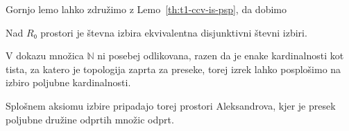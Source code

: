 Gornjo lemo lahko združimo z Lemo~\ref{th:t1-ccv-is-psp}, da dobimo
\begin{trditev}
  Nad \(R₀\) prostori je števna izbira ekvivalentna disjunktivni števni izbiri.
\end{trditev}
\begin{opomba}
  V dokazu množica \(ℕ\) ni posebej odlikovana, razen da je enake kardinalnosti
  kot tista, za katero je topologija zaprta za preseke, torej izrek lahko
  posplošimo na izbiro poljubne kardinalnosti.

  Splošnem aksiomu izbire pripadajo torej prostori Aleksandrova, kjer je presek
  poljubne družine odprtih množic odprt.
\end{opomba}


